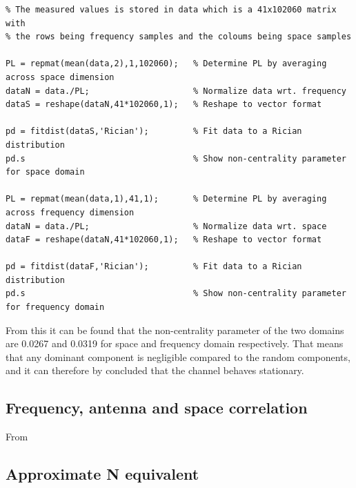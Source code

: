 \begin{lstlisting}
% The measured values is stored in data which is a 41x102060 matrix with
% the rows being frequency samples and the coloums being space samples

PL = repmat(mean(data,2),1,102060);   % Determine PL by averaging across space dimension 
dataN = data./PL;                     % Normalize data wrt. frequency
dataS = reshape(dataN,41*102060,1);   % Reshape to vector format

pd = fitdist(dataS,'Rician');         % Fit data to a Rician distribution
pd.s                                  % Show non-centrality parameter for space domain

PL = repmat(mean(data,1),41,1);       % Determine PL by averaging across frequency dimension
dataN = data./PL;                     % Normalize data wrt. space
dataF = reshape(dataN,41*102060,1);   % Reshape to vector format

pd = fitdist(dataF,'Rician');         % Fit data to a Rician distribution
pd.s                                  % Show non-centrality parameter for frequency domain
\end{lstlisting}

From this it can be found that the non-centrality parameter of the two domains are 0.0267 and 0.0319 for space and frequency domain respectively. That means that any dominant component is negligible compared to the random components, and it can therefore by concluded that the channel behaves stationary.


\subsection{Frequency, antenna and space correlation}
From 

\begin{minipage}{0.33\textwidth}

\end{minipage}%
\begin{minipage}{0.33\textwidth}

\end{minipage}%
\begin{minipage}{0.33\textwidth}

\end{minipage}

\subsection{Approximate N equivalent}

